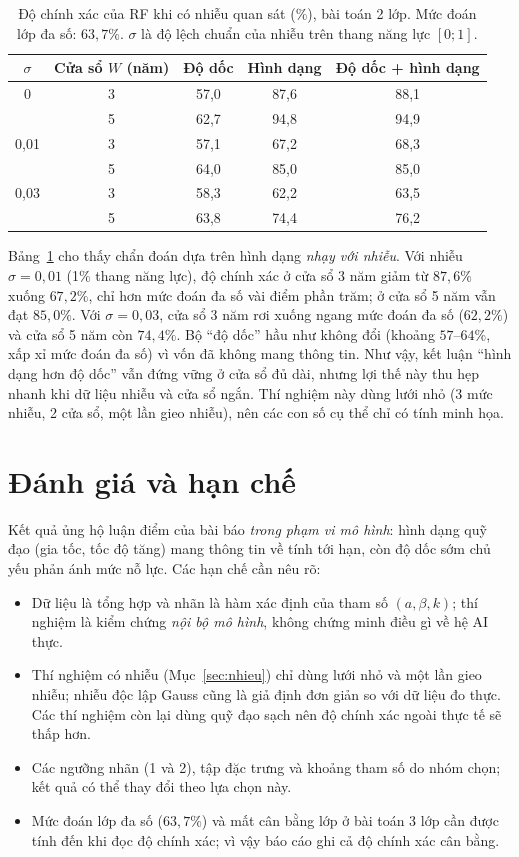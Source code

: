 \documentclass[12pt,a4paper,openany]{report}
\numberwithin{equation}{chapter}   %
\theoremstyle{definition}
\begin{document}
\begin{table}[ht]
\centering
\caption{Độ chính xác của RF khi có nhiễu quan sát (\%), bài toán 2 lớp. Mức đoán lớp đa số: $63{,}7\%$. $\sigma$ là độ lệch chuẩn của nhiễu trên thang năng lực $[0;1]$.}\label{tab:nhieu}
\begin{tabular}{@{}ccccc@{}}
\toprule
$\sigma$ & \textbf{Cửa sổ $W$ (năm)} & \textbf{Độ dốc} & \textbf{Hình dạng} & \textbf{Độ dốc + hình dạng}\\
\midrule
0     & 3 & 57,0 & 87,6 & 88,1\\
      & 5 & 62,7 & 94,8 & 94,9\\
0,01  & 3 & 57,1 & 67,2 & 68,3\\
      & 5 & 64,0 & 85,0 & 85,0\\
0,03  & 3 & 58,3 & 62,2 & 63,5\\
      & 5 & 63,8 & 74,4 & 76,2\\
\bottomrule
\end{tabular}
\end{table}

Bảng~\ref{tab:nhieu} cho thấy chẩn đoán dựa trên hình dạng \emph{nhạy với nhiễu}. Với nhiễu $\sigma=0{,}01$ (1\% thang năng lực), độ chính xác ở cửa sổ 3 năm giảm từ $87{,}6\%$ xuống $67{,}2\%$, chỉ hơn mức đoán đa số vài điểm phần trăm; ở cửa sổ 5 năm vẫn đạt $85{,}0\%$. Với $\sigma=0{,}03$, cửa sổ 3 năm rơi xuống ngang mức đoán đa số ($62{,}2\%$) và cửa sổ 5 năm còn $74{,}4\%$. Bộ ``độ dốc'' hầu như không đổi (khoảng $57$--$64\%$, xấp xỉ mức đoán đa số) vì vốn đã không mang thông tin. Như vậy, kết luận ``hình dạng hơn độ dốc'' vẫn đứng vững ở cửa sổ đủ dài, nhưng lợi thế này thu hẹp nhanh khi dữ liệu nhiễu và cửa sổ ngắn. Thí nghiệm này dùng lưới nhỏ (3 mức nhiễu, 2 cửa sổ, một lần gieo nhiễu), nên các con số cụ thể chỉ có tính minh họa.

\section{Đánh giá và hạn chế}
Kết quả ủng hộ luận điểm của bài báo \emph{trong phạm vi mô hình}: hình dạng quỹ đạo (gia tốc, tốc độ tăng) mang thông tin về tính tới hạn, còn độ dốc sớm chủ yếu phản ánh mức nỗ lực. Các hạn chế cần nêu rõ:
\begin{itemize}
  \item Dữ liệu là tổng hợp và nhãn là hàm xác định của tham số $(a,\beta,k)$; thí nghiệm là kiểm chứng \emph{nội bộ mô hình}, không chứng minh điều gì về hệ AI thực.
  \item Thí nghiệm có nhiễu (Mục~\ref{sec:nhieu}) chỉ dùng lưới nhỏ và một lần gieo nhiễu; nhiễu độc lập Gauss cũng là giả định đơn giản so với dữ liệu đo thực. Các thí nghiệm còn lại dùng quỹ đạo sạch nên độ chính xác ngoài thực tế sẽ thấp hơn.
  \item Các ngưỡng nhãn (1 và 2), tập đặc trưng và khoảng tham số do nhóm chọn; kết quả có thể thay đổi theo lựa chọn này.
  \item Mức đoán lớp đa số ($63{,}7\%$) và mất cân bằng lớp ở bài toán 3 lớp cần được tính đến khi đọc độ chính xác; vì vậy báo cáo ghi cả độ chính xác cân bằng.
\end{itemize}
\end{document}
